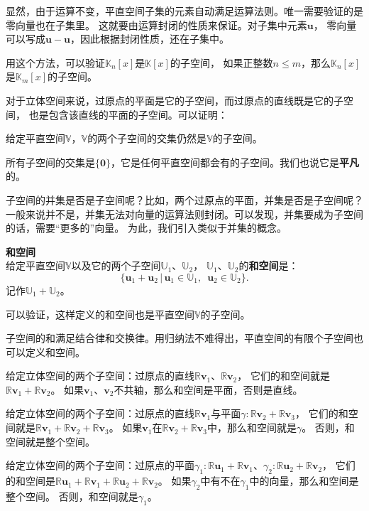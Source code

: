 \documentclass[12pt,UTF8,fontset=none]{ctexbook}
\begin{document}
显然，由于运算不变，平直空间子集的元素自动满足运算法则。唯一需要验证的是零向量也在子集里。
这就要由运算封闭的性质来保证。对子集中元素$\mathbf{u}$，
零向量可以写成$\mathbf{u} - \mathbf{u}$，因此根据封闭性质，还在子集中。

用这个方法，可以验证$\mathbb{K}_n[x]$是$\mathbb{K}[x]$的子空间，
如果正整数$n\leqslant m$，那么$\mathbb{K}_n[x]$是$\mathbb{K}_m[x]$的子空间。

对于立体空间来说，过原点的平面是它的子空间，而过原点的直线既是它的子空间，
也是包含该直线的平面的子空间。可以证明：

\begin{tm}
    给定平直空间$\mathbb{V}$，$\mathbb{V}$的两个子空间的交集仍然是$\mathbb{V}$的子空间。
\end{tm}

所有子空间的交集是$\{\mathbf{0}\}$，它是任何平直空间都会有的子空间。我们也说它是\textbf{平凡}的。

子空间的并集是否是子空间呢？比如，两个过原点的平面，并集是否是子空间呢？
一般来说并不是，并集无法对向量的运算法则封闭。可以发现，并集要成为子空间的话，需要“更多的”向量。
为此，我们引入类似于并集的概念。

\begin{df}{\textbf{和空间}}
    \mbox{} \\
    给定平直空间$\mathbb{V}$以及它的两个子空间$\mathbb{U}_1$、$\mathbb{U}_2$，
    $\mathbb{U}_1$、$\mathbb{U}_2$的\textbf{和空间}是：
    $$ \{ \mathbf{u}_1 + \mathbf{u}_2\,|\, \mathbf{u}_1 \in \mathbb{U}_1,\,\,\, \mathbf{u}_2 \in \mathbb{U}_2\}.$$
    记作$\mathbb{U}_1 + \mathbb{U}_2$。
\end{df}
可以验证，这样定义的和空间也是平直空间$\mathbb{V}$的子空间。

子空间的和满足结合律和交换律。用归纳法不难得出，平直空间的有限个子空间也可以定义和空间。

给定立体空间的两个子空间：过原点的直线$\mathbb{R}\mathbf{v}_1$、$\mathbb{R}\mathbf{v}_2$，
它们的和空间就是$\mathbb{R}\mathbf{v}_1 + \mathbb{R}\mathbf{v}_2$。
如果$\mathbf{v}_1$、$\mathbf{v}_2$不共轴，那么和空间是平面，否则是直线。

给定立体空间的两个子空间：过原点的直线$\mathbb{R}\mathbf{v}_1$与平面$\gamma: \mathbb{R}\mathbf{v}_2 + \mathbb{R}\mathbf{v}_3$，
它们的和空间就是$\mathbb{R}\mathbf{v}_1 + \mathbb{R}\mathbf{v}_2 + \mathbb{R}\mathbf{v}_3$。
如果$\mathbf{v}_1$在$\mathbb{R}\mathbf{v}_2 + \mathbb{R}\mathbf{v}_3$中，那么和空间就是$\gamma$。
否则，和空间就是整个空间。

给定立体空间的两个子空间：过原点的平面$\gamma_1: \mathbb{R}\mathbf{u}_1 + \mathbb{R}\mathbf{v}_1$、$\gamma_2: \mathbb{R}\mathbf{u}_2 + \mathbb{R}\mathbf{v}_2$，
它们的和空间是$\mathbb{R}\mathbf{u}_1 + \mathbb{R}\mathbf{v}_1 + \mathbb{R}\mathbf{u}_2 + \mathbb{R}\mathbf{v}_2$。
如果$\gamma_2$中有不在$\gamma_1$中的向量，那么和空间是整个空间。
否则，和空间就是$\gamma_1$。
\end{document}
